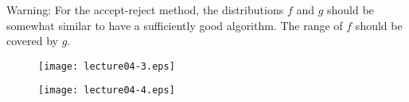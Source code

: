 \documentclass[11pt,twocolumn]{article} %
\begin{document}
\begin{enumerate}
Warning: For the accept-reject method, the distributions $f$ and
$g$ should be somewhat similar to have a sufficiently good
algorithm. The range of $f$ should be covered by $g$.

\begin{figure}
\centering
\renewcommand{\baselinestretch}{1}
\texttt{[image: lecture04-3.eps]}
\end{figure}

\begin{figure}
\centering
\renewcommand{\baselinestretch}{1}
\texttt{[image: lecture04-4.eps]}
\end{figure}

\end{enumerate}
\end{document}

